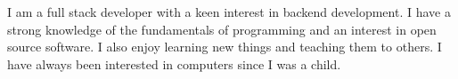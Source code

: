 

\begin{cvparagraph}

I am a full stack developer with a keen interest in backend development.
I have a strong knowledge of the fundamentals of programming and an interest in open source software. 
I also enjoy learning new things and teaching them to others. 
I have always been interested in computers since I was a child.

\end{cvparagraph}
